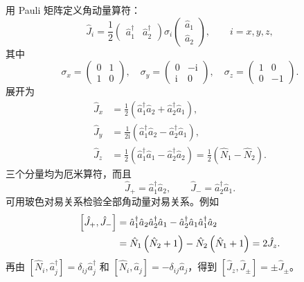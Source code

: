 用 Pauli 矩阵定义角动量算符：
\begin{equation}
\hat J_i=\frac12\left(\begin{matrix}\hat a_1^\dag&\hat a_2^\dag\end{matrix}\right)
\sigma_i\left(\begin{matrix}\hat a_1\\\hat a_2\end{matrix}\right),\qquad i=x,y,z,
\end{equation}
其中
\begin{equation}
\sigma_x=\left(\begin{matrix}0&1\\1&0\end{matrix}\right),\quad
\sigma_y=\left(\begin{matrix}0&-\mathrm{i}\\\mathrm{i}&0\end{matrix}\right),\quad
\sigma_z=\left(\begin{matrix}1&0\\0&-1\end{matrix}\right).
\end{equation}
展开为
\begin{align}
\hat J_x&=\frac12\left(\hat a_1^\dag\hat a_2+\hat a_2^\dag\hat a_1\right),\\
\hat J_y&=\frac1{2\mathrm{i}}\left(\hat a_1^\dag\hat a_2-\hat a_2^\dag\hat a_1\right),\\
\hat J_z&=\frac12\left(\hat a_1^\dag\hat a_1-\hat a_2^\dag\hat a_2\right)
=\frac12\left(\hat N_1-\hat N_2\right).
\end{align}
三个分量均为厄米算符，而且
\begin{equation}
\hat J_+=\hat a_1^\dag\hat a_2,\qquad
\hat J_-=\hat a_2^\dag\hat a_1.
\end{equation}
可用玻色对易关系检验全部角动量对易关系。例如
\begin{align}
\left[\hat J_+,\hat J_-\right]
&=\hat a_1^\dag\hat a_2\hat a_2^\dag\hat a_1
-\hat a_2^\dag\hat a_1\hat a_1^\dag\hat a_2\notag\\
&=\hat N_1\left(\hat N_2+1\right)-\hat N_2\left(\hat N_1+1\right)
=2\hat J_z.
\end{align}
再由 $\left[\hat N_i,\hat a_j^\dag\right]=\delta_{ij}\hat a_j^\dag$ 和
$\left[\hat N_i,\hat a_j\right]=-\delta_{ij}\hat a_j$，得到 $\left[\hat J_z,\hat J_\pm\right]=\pm\hat J_\pm$。

